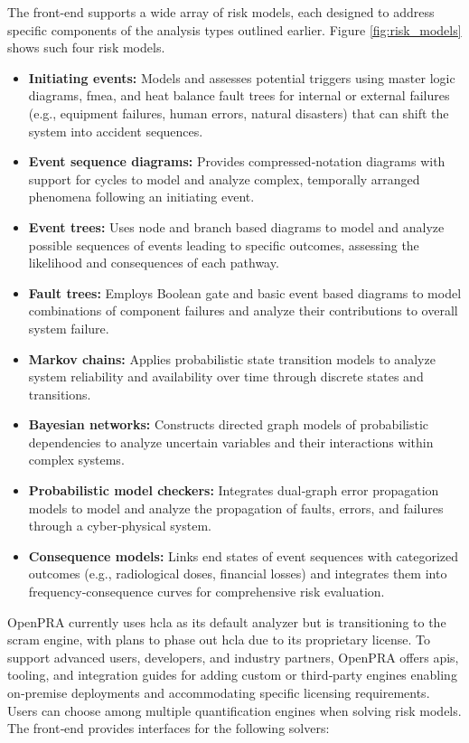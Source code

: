 The front-end supports a wide array of risk models, each designed to address specific components of the analysis types outlined earlier. Figure \ref{fig:risk_models} shows such four risk models. 

\begin{itemize}
  \item \textbf{Initiating events:} Models and assesses potential triggers using master logic diagrams, \acrshort{fmea}, and heat balance fault trees for internal or external failures (e.g., equipment failures, human errors, natural disasters) that can shift the system into accident sequences.
  \item \textbf{Event sequence diagrams:} Provides compressed‑notation diagrams with support for cycles to model and analyze complex, temporally arranged phenomena following an initiating event.
  \item \textbf{Event trees:} Uses node and branch based diagrams to model and analyze possible sequences of events leading to specific outcomes, assessing the likelihood and consequences of each pathway.
  \item \textbf{Fault trees:} Employs Boolean gate and basic event based diagrams to model combinations of component failures and analyze their contributions to overall system failure.
  \item \textbf{Markov chains:} Applies probabilistic state transition models to analyze system reliability and availability over time through discrete states and transitions.
  \item \textbf{Bayesian networks:} Constructs directed graph models of probabilistic dependencies to analyze uncertain variables and their interactions within complex systems.
  \item \textbf{Probabilistic model checkers:} Integrates dual‑graph error propagation models to model and analyze the propagation of faults, errors, and failures through a cyber‑physical system.
  \item \textbf{Consequence models:} Links end states of event sequences with categorized outcomes (e.g., radiological doses, financial losses) and integrates them into frequency‑consequence curves for comprehensive risk evaluation.
\end{itemize}



OpenPRA currently uses \acrshort{hcla} as its default analyzer but is transitioning to the scram engine, with plans to phase out \acrfull{hcla} due to its proprietary license. To support advanced users, developers, and industry partners, OpenPRA offers \acrfull{api}s, tooling, and integration guides for adding custom or third‑party engines enabling on‑premise deployments and accommodating specific licensing requirements. Users can choose among multiple quantification engines when solving risk models. The front‑end provides interfaces for the following solvers:

